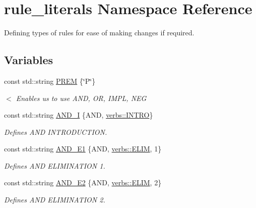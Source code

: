 \hypertarget{namespacerule__literals}{}\section{rule\+\_\+literals Namespace Reference}
\label{namespacerule__literals}


Defining types of rules for ease of making changes if required.  


\subsection*{Variables}
\begin{DoxyCompactItemize}
\item 
const std\+::string \mbox{\hyperlink{namespacerule__literals_a28f9829b438b28638be8c82c450237e1}{P\+R\+EM}} \{\char`\"{}P\char`\"{}\}
\begin{DoxyCompactList}\small\item\em $<$ Enables us to use A\+ND, OR, I\+M\+PL, N\+EG \end{DoxyCompactList}\item 
const std\+::string \mbox{\hyperlink{namespacerule__literals_a94631d6e4135b29c6bacb5cde1d9719b}{A\+N\+D\+\_\+I}} \{A\+ND, \mbox{\hyperlink{namespaceverbs_a160cd2b49b96eb11b6db907bf94b5c3a}{verbs\+::\+I\+N\+T\+RO}}\}
\begin{DoxyCompactList}\small\item\em Defines A\+ND I\+N\+T\+R\+O\+D\+U\+C\+T\+I\+ON. \end{DoxyCompactList}\item 
const std\+::string \mbox{\hyperlink{namespacerule__literals_af7751bceefaea1ff69733140731b7770}{A\+N\+D\+\_\+\+E1}} \{A\+ND, \mbox{\hyperlink{namespaceverbs_ae28355cc9321ebee9abcd23bb6e1b836}{verbs\+::\+E\+L\+IM}}, \textquotesingle{}1\textquotesingle{}\}
\begin{DoxyCompactList}\small\item\em Defines A\+ND E\+L\+I\+M\+I\+N\+A\+T\+I\+ON 1. \end{DoxyCompactList}\item 
const std\+::string \mbox{\hyperlink{namespacerule__literals_a0861b2e3104a4c1465d3dbbb362b5d10}{A\+N\+D\+\_\+\+E2}} \{A\+ND, \mbox{\hyperlink{namespaceverbs_ae28355cc9321ebee9abcd23bb6e1b836}{verbs\+::\+E\+L\+IM}}, \textquotesingle{}2\textquotesingle{}\}
\begin{DoxyCompactList}\small\item\em Defines A\+ND E\+L\+I\+M\+I\+N\+A\+T\+I\+ON 2. \end{DoxyCompactList}\item 

\end{DoxyCompactItemize}
